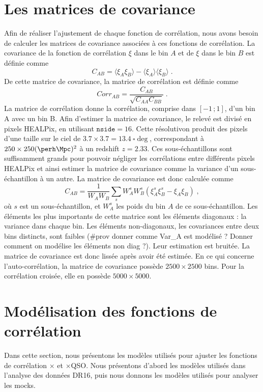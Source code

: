 \documentclass[11pt, twoside, a4paper, openright]{report}
\begin{document}
\section{Les matrices de covariance}
Afin de réaliser l'ajustement de chaque fonction de corrélation, nous avons besoin de calculer les matrices de covariance associées à ces fonctions de corrélation. La covariance de la fonction de corrélation $\xi$ dans le bin $A$ et de $\xi$ dans le bin $B$ est définie comme
\begin{equation}
  C_{AB} = \langle \xi_A \xi_B \rangle - \langle \xi_A \rangle \langle \xi_B \rangle \; .
\end{equation}
De cette matrice de covariance, la matrice de corrélation est définie comme
\begin{equation}
  Corr_{AB} = \frac{C_{AB}}{\sqrt{C_{AA} C_{BB}}} \; .
\end{equation}
La matrice de corrélation donne la corrélation, comprise dans $[-1 \, ; 1]$, d'un bin A avec un bin B.
Afin d'estimer la matrice de covariance, le relevé est divisé en pixels HEALPix, en utilisant $\texttt{nside} = \num{16}$. Cette résolutivon produit des pixels d'une taille sur le ciel de $\num{3.7} \times \num{3.7} = \SI{13.4}{\square\deg}$, correspondant à $\num{250} \times \num{250} (\si{\perh\Mpc})^2$ à un redshift $z = \num{2.33}$. Ces sous-échantillons sont suffisamment grands pour pouvoir négliger les corrélations entre différents pixels HEALPix et ainsi estimer la matrice de covariance comme la variance d'un sous-échantillon à un autre. La matrice de covariance est donc calculée comme
\begin{equation}
  C_{AB} = \frac{1}{W_A W_B} \sum_s W_A^s W_B^s \left( \xi_A^s \xi_B^s - \xi_A \xi_B \right) \; ,
\end{equation}
où $s$ est un sous-échantillon, et $W_A^s$ les poids du bin $A$ de ce sous-échantillon.
Les éléments les plus importants de cette matrice sont les éléments diagonaux : la variance dans chaque bin. Les éléments non-diagonaux, les covariances entre deux bins distincts, sont faibles (\#prov donner comme Var\_A est modélisé ? Donner comment on modélise les éléments non diag ?). Leur estimation est bruitée. La matrice de covariance est donc lissée après avoir été estimée.
En ce qui concerne l'auto-corrélation, la matrice de covariance possède $\num{2500} \times \num{2500}$ bins. Pour la corrélation croisée, elle en possède $\num{5000} \times \num{5000}$.



\section{Modélisation des fonctions de corrélation}
Dans cette section, nous présentons les modèles utilisés pour ajuster les fonctions de corrélation \lya{}$\times$\lya{} et \lya{}$\times$QSO. Nous présentons d'abord les modèles utilisés dans l'analyse des données DR16, puis nous donnons les modèles utilisés pour analyser les mocks.
\end{document}
